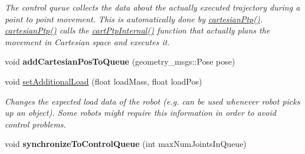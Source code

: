 \begin{DoxyCompactItemize}
\begin{DoxyCompactList}\small\item\em The control queue collects the data about the actually executed trajectory during a point to point movement. This is automatically done by \hyperlink{classkukadu_1_1ControlQueue_a1bfa23a8ce6319f6ef0ed9208e896054}{cartesian\+Ptp()}. \hyperlink{classkukadu_1_1ControlQueue_a1bfa23a8ce6319f6ef0ed9208e896054}{cartesian\+Ptp()} calls the \hyperlink{classkukadu_1_1PlottingControlQueue_afb803b02a1c0f0d7270910583c3d839b}{cart\+Ptp\+Internal()} function that actually plans the movement in Cartesian space and executes it. \end{DoxyCompactList}\item 
void {\bfseries add\+Cartesian\+Pos\+To\+Queue} (geometry\+\_\+msgs\+::\+Pose pose)\hypertarget{classkukadu_1_1PlottingControlQueue_af36df3ed101584adf809c4ebbc70cebc}{}\label{classkukadu_1_1PlottingControlQueue_af36df3ed101584adf809c4ebbc70cebc}

\item 
void \hyperlink{classkukadu_1_1PlottingControlQueue_ab6dc63e59f83a1c0ae9fa5b608eb25a4}{set\+Additional\+Load} (float load\+Mass, float load\+Pos)
\begin{DoxyCompactList}\small\item\em Changes the expected load data of the robot (e.\+g. can be used whenever robot picks up an object). Some robots might require this information in order to avoid control problems. \end{DoxyCompactList}\item 
void {\bfseries synchronize\+To\+Control\+Queue} (int max\+Num\+Joints\+In\+Queue)\hypertarget{classkukadu_1_1PlottingControlQueue_a2aff18de1b47aaab576e2e8ceb9bb7bb}{}\label{classkukadu_1_1PlottingControlQueue_a2aff18de1b47aaab576e2e8ceb9bb7bb}


\end{DoxyCompactItemize}
